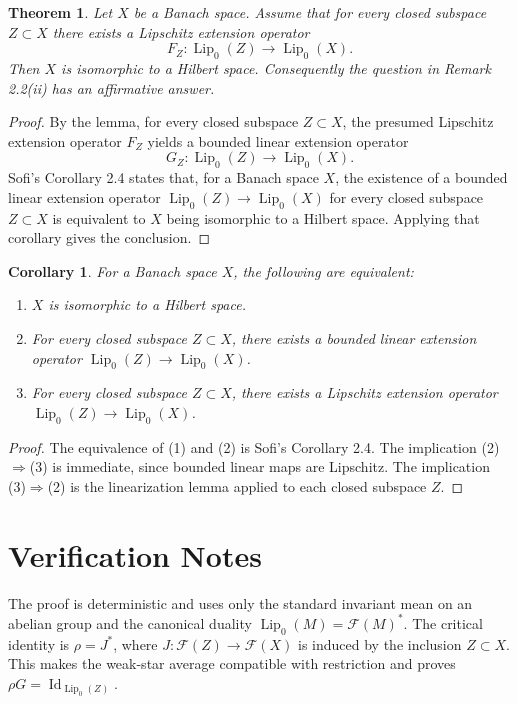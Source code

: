 \documentclass[11pt]{article}
\newtheorem{theorem}{Theorem}
\newtheorem{corollary}{Corollary}
\newcommand{\Lipz}{\operatorname{Lip}_0}
\newcommand{\FF}{\mathcal F}
\newcommand{\Id}{\operatorname{Id}}
\begin{document}
\begin{theorem}
Let \(X\) be a Banach space. Assume that for every closed subspace \(Z\subset
X\) there exists a Lipschitz extension operator
\[
        F_Z:\Lipz(Z)\longrightarrow \Lipz(X).
\]
Then \(X\) is isomorphic to a Hilbert space. Consequently the question in
Remark 2.2(ii) has an affirmative answer.
\end{theorem}

\begin{proof}
By the lemma, for every closed subspace \(Z\subset X\), the presumed Lipschitz
extension operator \(F_Z\) yields a bounded linear extension operator
\[
        G_Z:\Lipz(Z)\longrightarrow \Lipz(X).
\]
Sofi's Corollary 2.4 states that, for a Banach space \(X\), the existence of a
bounded linear extension operator \(\Lipz(Z)\to\Lipz(X)\) for every closed
subspace \(Z\subset X\) is equivalent to \(X\) being isomorphic to a Hilbert
space. Applying that corollary gives the conclusion.
\end{proof}

\begin{corollary}
For a Banach space \(X\), the following are equivalent:
\begin{enumerate}
\item \(X\) is isomorphic to a Hilbert space.
\item For every closed subspace \(Z\subset X\), there exists a bounded linear
extension operator \(\Lipz(Z)\to\Lipz(X)\).
\item For every closed subspace \(Z\subset X\), there exists a Lipschitz
extension operator \(\Lipz(Z)\to\Lipz(X)\).
\end{enumerate}
\end{corollary}

\begin{proof}
The equivalence of (1) and (2) is Sofi's Corollary 2.4. The implication
(2)\(\Rightarrow\)(3) is immediate, since bounded linear maps are Lipschitz.
The implication (3)\(\Rightarrow\)(2) is the linearization lemma applied to
each closed subspace \(Z\).
\end{proof}

\section*{Verification Notes}

The proof is deterministic and uses only the standard invariant mean on an
abelian group and the canonical duality \(\Lipz(M)=\FF(M)^*\). The critical
identity is \(\rho=J^*\), where \(J:\FF(Z)\to\FF(X)\) is induced by the
inclusion \(Z\subset X\). This makes the weak-star average compatible with
restriction and proves \(\rho G=\Id_{\Lipz(Z)}\).
\end{document}
